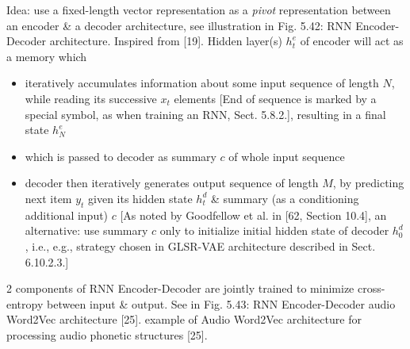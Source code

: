 \documentclass{article}
\begin{document}
\begin{itemize}
\begin{itemize}
\begin{itemize}
			Idea: use a fixed-length vector representation as a {\it pivot} representation between an encoder \& a decoder architecture, see illustration in {\sf Fig. 5.42: RNN Encoder-Decoder architecture. Inspired from [19]}. Hidden layer(s) $h_t^e$ of encoder will act as a memory which
			\begin{itemize}
				\item iteratively accumulates information about some input sequence of length $N$, while reading its successive $x_t$ elements [End of sequence is marked by a special symbol, as when training an RNN, Sect. 5.8.2.], resulting in a final state $h_N^e$
				\item which is passed to decoder as summary $c$ of whole input sequence
				\item decoder then iteratively generates output sequence of length $M$, by predicting next item $y_t$ given its hidden state $h_t^d$ \& summary (as a conditioning additional input) $c$ [As noted by Goodfellow et al. in [62, Section 10.4], an alternative: use summary $c$ only to initialize initial hidden state of decoder $h_0^d$, i.e., e.g., strategy chosen in GLSR-VAE architecture described in Sect. 6.10.2.3.]
			\end{itemize}
			2 components of RNN Encoder-Decoder are jointly trained to minimize cross-entropy between input \& output. See in {\sf Fig. 5.43: RNN Encoder-Decoder audio Word2Vec architecture [25].} example of Audio Word2Vec architecture for processing audio phonetic structures [25].
			

\end{itemize}
\end{itemize}
\end{itemize}
\end{document}
